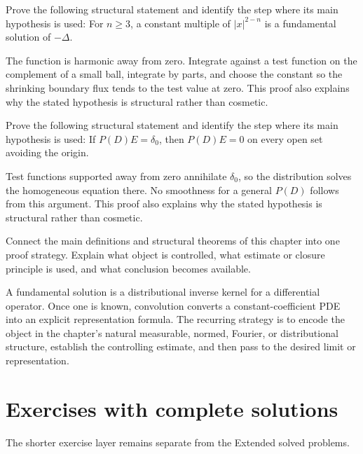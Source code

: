 \begin{problem}\label{prob:iii24-problem-10}
Prove the following structural statement and identify the step where its main hypothesis is used: For $n\ge3$, a constant multiple of $|x|^{2-n}$ is a fundamental solution of $-\Delta$.
\end{problem}
\begin{solution}
The function is harmonic away from zero. Integrate against a test function on the complement of a small ball, integrate by parts, and choose the constant so the shrinking boundary flux tends to the test value at zero. This proof also explains why the stated hypothesis is structural rather than cosmetic.
\end{solution}

\begin{problem}\label{prob:iii24-problem-11}
Prove the following structural statement and identify the step where its main hypothesis is used: If $P(D)E=\delta_0$, then $P(D)E=0$ on every open set avoiding the origin.
\end{problem}
\begin{solution}
Test functions supported away from zero annihilate $\delta_0$, so the distribution solves the homogeneous equation there. No smoothness for a general $P(D)$ follows from this argument. This proof also explains why the stated hypothesis is structural rather than cosmetic.
\end{solution}

\begin{problem}\label{prob:iii24-problem-12}
Connect the main definitions and structural theorems of this chapter into one proof strategy. Explain what object is controlled, what estimate or closure principle is used, and what conclusion becomes available.
\end{problem}
\begin{solution}
A fundamental solution is a distributional inverse kernel for a differential operator. Once one is known, convolution converts a constant-coefficient PDE into an explicit representation formula. The recurring strategy is to encode the object in the chapter's natural measurable, normed, Fourier, or distributional structure, establish the controlling estimate, and then pass to the desired limit or representation.
\end{solution}
\section{Exercises with complete solutions}
The shorter exercise layer remains separate from the Extended solved problems.


